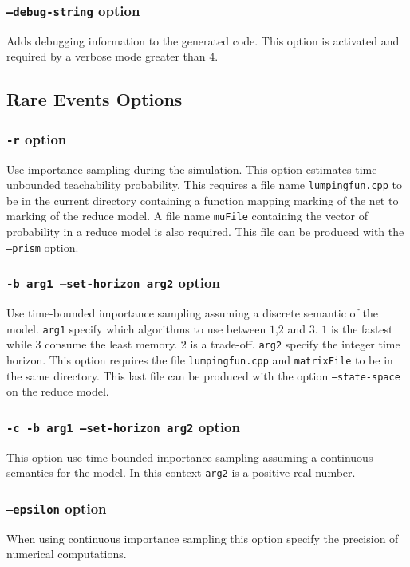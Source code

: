 \documentclass{article}
\begin{document}
\subsubsection{\texttt{--debug-string} option}
Adds debugging information to the generated code. This option is activated
and required by a verbose mode greater than $4$.

\subsection{Rare Events Options}
\subsubsection{\texttt{-r} option}
Use importance sampling during the simulation. This option estimates
time-unbounded teachability probability. This requires a file name
\texttt{lumpingfun.cpp} to be in the current directory containing a
function mapping marking of the net to marking of the reduce model. A
file name \texttt{muFile} containing the vector of probability in a
reduce model is also required. This file can be produced with the
\texttt{--prism} option.

\subsubsection{\texttt{-b arg1 --set-horizon arg2} option}
Use time-bounded importance sampling assuming a discrete semantic of
the model. \texttt{arg1} specify which algorithms to use between $1$,$2$
and $3$. $1$ is the fastest while $3$ consume the least memory. $2$ is
a trade-off. \texttt{arg2} specify the integer time horizon. This
option requires the file \texttt{lumpingfun.cpp} and
\texttt{matrixFile} to be in the same directory. This last file can 
be produced with the option \texttt{--state-space} on the reduce model.

\subsubsection{\texttt{-c -b arg1 --set-horizon arg2} option}
This option use time-bounded importance sampling assuming a continuous
semantics for the model. In this context \texttt{arg2} is a positive real
number.

\subsubsection{\texttt{--epsilon} option}
When using continuous importance sampling this option specify the
precision of numerical computations.
\end{document}
